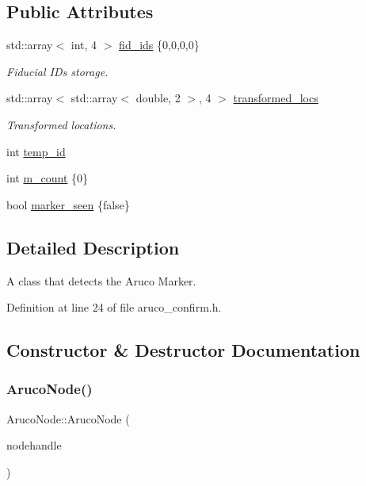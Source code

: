 \subsection*{Public Attributes}
\begin{DoxyCompactItemize}
\item 
std\+::array$<$ int, 4 $>$ \hyperlink{class_aruco_node_aa64bc8aad47d7569e315f5045ecaa7ac}{fid\+\_\+ids} \{0,0,0,0\}
\begin{DoxyCompactList}\small\item\em Fiducial I\+Ds storage. \end{DoxyCompactList}\item 
std\+::array$<$ std\+::array$<$ double, 2 $>$, 4 $>$ \hyperlink{class_aruco_node_ab410bc0b655071ee67e7ba63b4edf256}{transformed\+\_\+locs}
\begin{DoxyCompactList}\small\item\em Transformed locations. \end{DoxyCompactList}\item 
int \hyperlink{class_aruco_node_ac9561321e855855ccc8f643cc139a638}{temp\+\_\+id}
\item 
int \hyperlink{class_aruco_node_a454cdb8d15fa07e7913887a1b2029600}{m\+\_\+count} \{0\}
\item 
bool \hyperlink{class_aruco_node_a21fe489a4ab6a73e807e74a5c1de466d}{marker\+\_\+seen} \{false\}
\end{DoxyCompactItemize}


\subsection{Detailed Description}
A class that detects the Aruco Marker. 

Definition at line 24 of file aruco\+\_\+confirm.\+h.



\subsection{Constructor \& Destructor Documentation}
\mbox{\label{class_aruco_node_ad539e5027a1d41e9e62f354db9ec40aa}} 
\subsubsection{\texorpdfstring{Aruco\+Node()}{ArucoNode()}}
{\footnotesize\ttfamily Aruco\+Node\+::\+Aruco\+Node (\begin{DoxyParamCaption}\item[{ros\+::\+Node\+Handle $\ast$}]{nodehandle }\end{DoxyParamCaption})}



